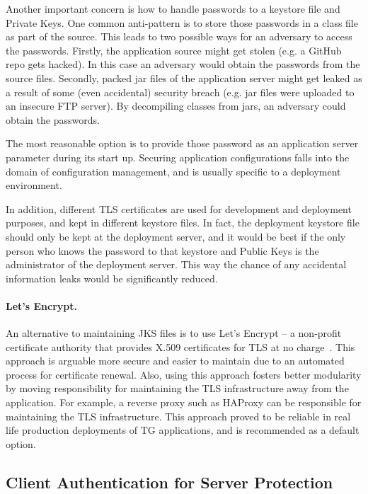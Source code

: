 \documentclass[a4paper,12pt,oneside,openright]{memoir}
\begin{document}
	Another important concern is how to handle passwords to a keystore file and Private Keys.
	One common anti-pattern is to store those passwords in a class file as part of the source.
	This leads to two possible ways for an adversary to access the passwords.
	Firstly, the application source might get stolen (e.g. a GitHub repo gets hacked).
	In this case an adversary would obtain the passwords from the source files.
	Secondly, packed jar files of the application server might get leaked as a result of some (even accidental) security breach (e.g. jar files were uploaded to an insecure FTP server).
	By decompiling classes from jars, an adversary could obtain the passwords.

	The most reasonable option is to provide those password as an application server parameter during its start up.
	Securing application configurations falls into the domain of configuration management, and is usually specific to a deployment environment.

	In addition, different TLS certificates are used for development and deployment purposes, and kept in different keystore files.
	In fact, the deployment keystore file should only be kept at the deployment server, and it would be best if the only person who knows the password to that keystore and Public Keys is the administrator of the deployment server.
	This way the chance of any accidental information leaks would be significantly reduced.

	\paragraph{Let's Encrypt.}
	An alternative to maintaining JKS files is to use Let's Encrypt -- a non-profit certificate authority that provides X.509 certificates for TLS at no charge~\cite{LEC}.
	This approach is arguable more secure and easier to maintain due to an automated process for certificate renewal.
	Also, using this approach fosters better modularity by moving responsibility for maintaining the TLS infrastructure away from the application.
	For example, a reverse proxy such as HAProxy can be responsible for maintaining the TLS infrastructure.
	This approach proved to be reliable in real life production deployments of TG applications, and is recommended as a default option.


\subsection*{Client Authentication for Server Protection}
\end{document}
